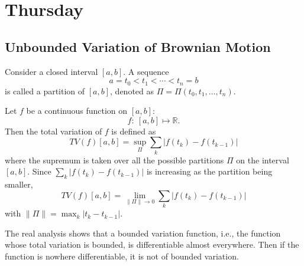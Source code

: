 \section{Thursday}
\subsection{Unbounded Variation of Brownian Motion}

\begin{definition}[Partition]
Consider a closed interval $[a,b]$. A sequence
\[
a=t_0<t_1<\cdots<t_n=b
\]
is called a partition of $[a,b]$, denoted as $\Pi = \Pi(t_0,t_1,\ldots,t_n)$.
\end{definition}

\begin{definition}
Let $f$ be a continuous function on $[a,b]$:
\[
f:~[a,b]\mapsto\mathbb{R}.
\]
Then the total variation of $f$ is defined as 
\[
TV(f)[a,b] = \sup_{\Pi}\sum_k|f(t_k) - f(t_{k-1})|
\]
where the supremum is taken over all the possible partitions $\Pi$ on the interval $[a,b]$.
Since $\sum_k|f(t_k) - f(t_{k-1})|$ is increasing as the partition being smaller, 
\[
TV(f)[a,b] = \lim_{\|\Pi\|\to0}\sum_k|f(t_k) - f(t_{k-1})|
\]
with $\|\Pi\|=\max_k|t_k - t_{k-1}|$.
\end{definition}

\begin{remark}
The real analysis shows that a bounded variation function, i.e., the function whose total variation is bounded, is differentiable almost everywhere.
Then if the function is nowhere differentiable, it is not of bounded variation.
\end{remark}

